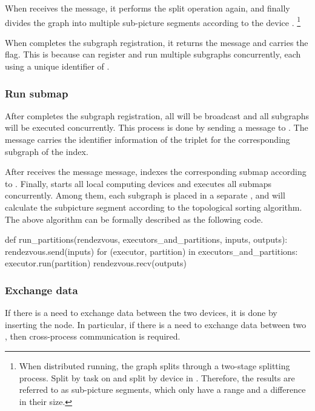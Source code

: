 \begin{content}
When  receives the  message, it performs the split operation again, and finally divides the graph into multiple sub-picture segments  according to the device . \footnote{When distributed running, the graph splits through a two-stage splitting process. Split by task on  and split by device in . Therefore, the results are referred to as sub-picture segments, which only have a range and a difference in their size.}

When  completes the subgraph registration, it returns the  message and carries the  flag. This is because  can register and run multiple subgraphs concurrently, each using a unique identifier of .


\subsubsection{Run submap}
After  completes the subgraph registration, all  will be broadcast and all subgraphs will be executed concurrently. This process is done by  sending a  message to . The message carries the identifier information of the  triplet for the corresponding subgraph of the  index.

After  receives the message  message,  indexes the corresponding submap according to . Finally,  starts all local computing devices and executes all submaps concurrently. Among them, each subgraph is placed in a separate , and  will calculate the subpicture segment according to the topological sorting algorithm. The above algorithm can be formally described as the following code.


\begin{leftbar}
  \begin{python}
def run_partitions(rendezvous, executors_and_partitions, inputs, outputs):
  rendezvous.send(inputs)
  for (executor, partition) in executors_and_partitions: 
    executor.run(partition)
  rendezvous.recv(outputs)
  \end{python}
\end{leftbar}


\subsubsection{Exchange data}
If there is a need to exchange data between the two devices, it is done by inserting the  node. In particular, if there is a need to exchange data between two , then cross-process communication is required.


\end{content}
